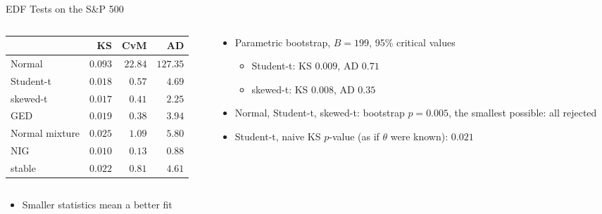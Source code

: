\begin{frame}{EDF Tests on the S\&P 500}
\itemsize{\footnotesize}
\begin{columns}[T]
\begin{column}{0.44\textwidth}
\begin{center}
\scriptsize
\begin{tabular}{lrrr}
\toprule
& KS & CvM & AD \\
\midrule
Normal & $0.093$ & $22.84$ & $127.35$ \\
Student-t & $0.018$ & $0.57$ & $4.69$ \\
skewed-t & $0.017$ & $0.41$ & $2.25$ \\
GED & $0.019$ & $0.38$ & $3.94$ \\
Normal mixture & $0.025$ & $1.09$ & $5.80$ \\
NIG & $0.010$ & $0.13$ & $0.88$ \\
stable & $0.022$ & $0.81$ & $4.61$ \\
\bottomrule
\end{tabular}
\end{center}

\end{column}
\begin{column}{0.52\textwidth}
\begin{itemize}
    \item Parametric bootstrap, $B = 199$, 95\% critical values
    \begin{itemize}
        \item Student-t: KS $0.009$, AD $0.71$
        \item skewed-t: KS $0.008$, AD $0.35$
    \end{itemize}
    \item Normal, Student-t, skewed-t: bootstrap $p = 0.005$, the smallest possible: all rejected
    \item Student-t, naive KS $p$-value (as if $\theta$ were known): $0.021$
\end{itemize}
\end{column}
\end{columns}\begin{itemize}
    \item Smaller statistics mean a better fit
\end{itemize}
\end{frame}

